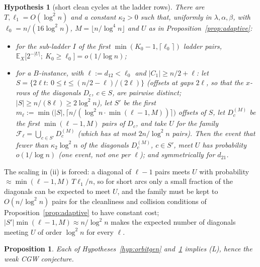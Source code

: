 \documentclass[11pt]{article}
\newtheorem{proposition}[theorem]{Proposition}
\newtheorem{hypothesis}[theorem]{Hypothesis}
\theoremstyle{definition}
\newcommand{\E}{\mathbb{E}}
\begin{document}
\begin{hypothesis}[short clean cycles at the ladder rows]\label{hyp:adaptive}
There are $T,\ell_1=O(\log^2n)$ and a constant $\kappa_2>0$ such that, uniformly in
$\lambda,\alpha,\beta$, with $\ell_0=n/(16\log^2n)$, $M=\lfloor n/\log^4n\rfloor$ and $U$ as
in Proposition~\ref{prop:adaptive}:
\begin{itemize}[leftmargin=2em]
\item[(i)] for the sub-ladder $I$ of the first $\min(K_0-1,\lceil\ell_0\rceil)$ ladder
pairs, $\E_X\bigl[2^{-|U|};\ K_0\ge\ell_0\bigr]=o(1/\log n)$;
\item[(ii)] for a $B$-instance, with $\ell:=d_{12}<\ell_0$ and $|C_1|\ge n/2+\ell$: let
$S=\{2\ell t:\ 0\le t\le(n/2-\ell)/(2\ell)\}$ (offsets at gaps $2\ell$, so that the $x$-rows
of the diagonals $D_c$, $c\in S$, are pairwise distinct; $|S|\ge n/(8\ell)\ge2\log^2n$),
let $S'$ be the first $m_\ell:=\min\bigl(|S|,\lceil n/(\log^2n\cdot\min(\ell-1,M))\rceil\bigr)$
offsets of $S$, let $D_c^{(M)}$ be the first $\min(\ell-1,M)$ pairs of $D_c$, and take $U$
for the family $\mathcal F_\ell=\bigcup_{c\in S'}D_c^{(M)}$ (which has at most
$2n/\log^2n$ pairs).  Then the event that fewer than $\kappa_2\log^2n$ of the diagonals
$D_c^{(M)}$, $c\in S'$, meet $U$ has probability $o(1/\log n)$ (one event, not one per
$\ell$); and symmetrically for $d_{21}$.
\end{itemize}
\end{hypothesis}
\noindent The scaling in (ii) is forced: a diagonal of $\ell-1$ pairs meets $U$ with
probability $\approx\min(\ell-1,M)\,T\ell_1/n$, so for short arcs only a small fraction of
the diagonals can be expected to meet $U$, and the family must be kept to
$O(n/\log^2n)$ pairs for the cleanliness and collision conditions of
Proposition~\ref{prop:adaptive} to have constant cost; $|S'|\min(\ell-1,M)\approx n/\log^2n$
makes the expected number of diagonals meeting $U$ of order $\log^2n$ for every $\ell$.

\begin{proposition}\label{prop:Lorbit}
Each of Hypotheses~\ref{hyp:orbitgen} and~\ref{hyp:adaptive} implies \textup{(L)}, hence
the weak CGW conjecture.
\end{proposition}
\end{document}

